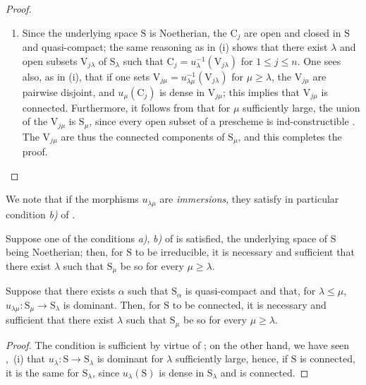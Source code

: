 \begin{proof}
\begin{enumerate}[label=(\roman*)]
  \item Since the underlying space $\mathrm{S}$ is Noetherian, the $\mathrm{C}_j$ are open and closed in $\mathrm{S}$ and quasi-compact; the same reasoning as in (i) shows that there exist $\lambda$ and open subsets $\mathrm{V}_{j\lambda}$ of $\mathrm{S}_\lambda$ such that $\mathrm{C}_j=u_\lambda^{-1}(\mathrm{V}_{j\lambda})$ for $1\leqslant j\leqslant n$.
One sees also, as in (i), that if one sets $\mathrm{V}_{j\mu}=u_{\lambda\mu}^{-1}(\mathrm{V}_{j\lambda})$ for $\mu\geqslant\lambda$, the $\mathrm{V}_{j\mu}$ are pairwise disjoint, and $u_\mu(\mathrm{C}_j)$ is dense in $\mathrm{V}_{j\mu}$; this implies that $\mathrm{V}_{j\mu}$ is connected.
Furthermore, it follows from  that for $\mu$ sufficiently large, the union of the $\mathrm{V}_{j\mu}$ is $\mathrm{S}_\mu$, since every open subset of a prescheme is ind-constructible .
The $\mathrm{V}_{j\mu}$ are thus the connected components of $\mathrm{S}_\mu$, and this completes the proof.
\end{enumerate}
\end{proof}

We note that if the morphisms $u_{\lambda\mu}$ are \emph{immersions}, they satisfy in particular condition \emph{b)} of .

\begin{corollary}[8.4.3]
\label{IV.8.4.3}
Suppose one of the conditions \emph{a)}, \emph{b)} of  is satisfied, the underlying space of $\mathrm{S}$ being Noetherian; then, for $\mathrm{S}$ to be irreducible, it is necessary and sufficient that there exist $\lambda$ such that $\mathrm{S}_\mu$ be so for every $\mu\geqslant\lambda$.
\end{corollary}

\begin{proposition}[8.4.4]
\label{IV.8.4.4}
Suppose that there exists $\alpha$ such that $\mathrm{S}_\alpha$ is quasi-compact and that, for $\lambda\leqslant\mu$, $u_{\lambda\mu}:\mathrm{S}_\mu\to\mathrm{S}_\lambda$ is dominant.
Then, for $\mathrm{S}$ to be connected, it is necessary and sufficient that there exist $\lambda$ such that $\mathrm{S}_\mu$ be so for every $\mu\geqslant\lambda$.
\end{proposition}

\begin{proof}
The condition is sufficient by virtue of ; on the other hand, we have seen ,~(i) that $u_\lambda:\mathrm{S}\to\mathrm{S}_\lambda$ is dominant for $\lambda$ sufficiently large, hence, if $\mathrm{S}$ is connected, it is the same for $\mathrm{S}_\lambda$, since $u_\lambda(\mathrm{S})$ is dense in $\mathrm{S}_\lambda$ and is connected.
\end{proof}

